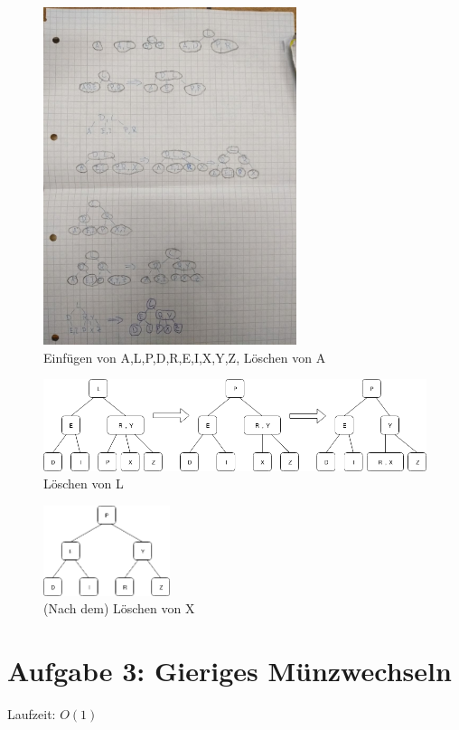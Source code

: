 \documentclass[
    10pt,
    parskip=half-,
    paper=a4,
    english,ngerman,
]{scrartcl}
\begin{document}
\begin{figure}[h]
	\centering
    \includegraphics[width=0.66\textwidth]{./1.jpg}
	\caption{Einfügen von A,L,P,D,R,E,I,X,Y,Z, Löschen von A}
	\label{fig1}
\end{figure}
\begin{figure}[ht]
	\centering
    \includegraphics[width=\textwidth]{./delL.png}
	\caption{Löschen von L}
	\label{fig2}
\end{figure}
\begin{figure}[ht]
	\centering
    \includegraphics[width=0.33\textwidth]{./delX.png}
	\caption{(Nach dem) Löschen von X}
	\label{fig3}
\end{figure}

\section*{Aufgabe 3: Gieriges Münzwechseln}

Laufzeit: $O(1)$
\end{document}

